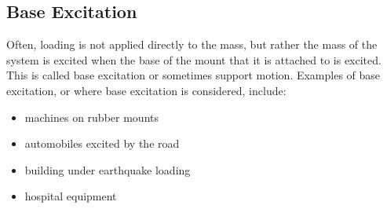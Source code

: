 \documentclass[12pt,letter]{article}
\numberwithin{ex}{section} %
\numberwithin{re}{section} %
\numberwithin{vcs}{section} %
\begin{document}
		
	
		\subsection{Base Excitation}

			Often, loading is not applied directly to the mass, but rather the mass of the system is excited when the base of the mount that it is attached to is excited. This is called base excitation or sometimes support motion. Examples of base excitation, or where base excitation is considered, include:
			
			\begin{itemize}
			\item machines on rubber mounts
			\item automobiles excited by the road
			\item building under earthquake loading
			\item hospital equipment
			\end{itemize}
			
\end{document}
